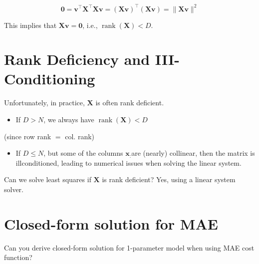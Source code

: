 $$
\mathbf{0}=\mathbf{v}^{\top} \mathbf{X}^{\top} \mathbf{X} \mathbf{v}=(\mathbf{X} \mathbf{v})^{\top}(\mathbf{X} \mathbf{v})=\|\mathbf{X} \mathbf{v}\|^{2}
$$

This implies that $\mathbf{X v}=\mathbf{0}$, i.e., $\operatorname{rank}(\mathbf{X})<D$.

\section*{Rank Deficiency and III-Conditioning}
Unfortunately, in practice, $\mathbf{X}$ is often rank deficient.

\begin{itemize}
  \item If $D>N$, we always have $\operatorname{rank}(\mathbf{X})<D$
\end{itemize}

(since row rank $=$ col. rank)

\begin{itemize}
  \item If $D \leq N$, but some of the columns $\mathbf{x}_{:}$are (nearly) collinear, then the matrix is illconditioned, leading to numerical issues when solving the linear system.
\end{itemize}

Can we solve least squares if $\mathbf{X}$ is rank deficient? Yes, using a linear system solver.

\section*{Closed-form solution for MAE}
Can you derive closed-form solution for 1-parameter model when using MAE cost function?


